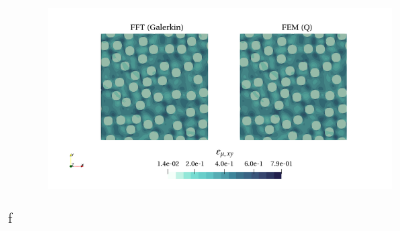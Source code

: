 \begin{figure}[hbt]
\begin{subfigure}[b]{0.49\textwidth}
    \caption{}
    \label{subfig:hencky_2D_shear_cpu_time_vs_n_voxels}
  \end{subfigure}
  \begin{subfigure}[b]{\textwidth}
    \centering
    \includegraphics[width=\textwidth]{figures/hencky_2D_shear_strain_12}
    \caption{}
    \label{subfig:hencky_2D_shear_strain_12}
  \end{subfigure}
\caption{f}
\label{fig:linear_2D_shear_comparison_crit}
\end{figure}

